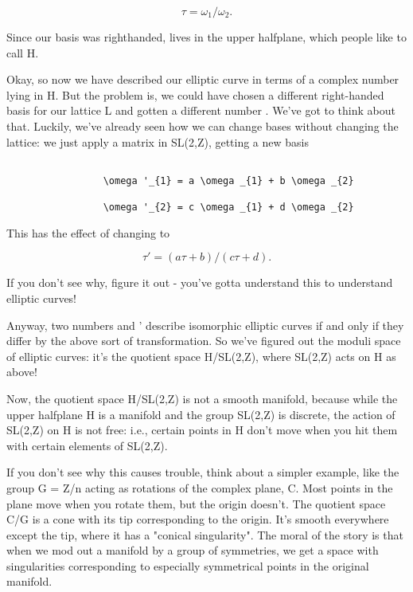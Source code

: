 $$

                       \tau  = \omega _{1}/\omega _{2}.
$$
    
Since our basis was righthanded, \tau  lives in the upper halfplane, 
which people like to call H.  

Okay, so now we have described our elliptic curve in terms of a
complex number \tau  lying in H.  But the problem is, we could have
chosen a different right-handed basis for our lattice L and gotten a
different number \tau .  We've got to think about that.  Luckily, we've
already seen how we can change bases without changing the lattice: we
just apply a matrix in SL(2,Z), getting a new basis


\begin{verbatim}

                 \omega '_{1} = a \omega _{1} + b \omega _{2}

                 \omega '_{2} = c \omega _{1} + d \omega _{2}
\end{verbatim}
    
This has the effect of changing \tau  to 

$$

                \tau ' = (a \tau  + b)/(c \tau  + d).
$$
    
If you don't see why, figure it out - you've gotta understand this to
understand elliptic curves!    

Anyway, two numbers \tau  and \tau ' describe isomorphic elliptic curves
if and only if they differ by the above sort of transformation.  So
we've figured out the moduli space of elliptic curves: it's the
quotient space H/SL(2,Z), where SL(2,Z) acts on H as above!

Now, the quotient space H/SL(2,Z) is not a smooth manifold, because
while the upper halfplane H is a manifold and the group SL(2,Z) is
discrete, the action of SL(2,Z) on H is not free: i.e., certain points
in H don't move when you hit them with certain elements of SL(2,Z).

If you don't see why this causes trouble, think about a simpler
example, like the group G = Z/n acting as rotations of the complex
plane, C.  Most points in the plane move when you rotate them, but the
origin doesn't.  The quotient space C/G is a cone with its tip
corresponding to the origin.  It's smooth everywhere except the tip,
where it has a "conical singularity".  The moral of the story is that
when we mod out a manifold by a group of symmetries, we get a space
with singularities corresponding to especially symmetrical points in
the original manifold.

